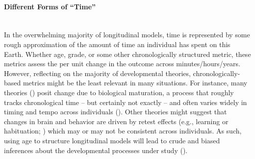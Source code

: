 \documentclass[11pt]{article}
\newcommand{\subsubsubsection}[1]{\paragraph{#1}\mbox{}\\}  %
\begin{document}
\subsubsubsection{Different Forms of “Time”}
In the overwhelming majority of longitudinal models, time is represented by some rough approximation of the amount of time an individual has spent on this Earth. Whether age, grade, or some other chronologically structured metric, these metrics assess the per unit change in the outcome across minutes/hours/years. However, reflecting on the majority of developmental theories, chronologically-based metrics might be the least relevant in many situations. For instance, many theories (\cite{casey_beyond_2015,van_duijvenvoorde_what_2016,wierenga_unraveling_2018}) posit change due to biological maturation, a process that roughly tracks chronological time -- but certainly not exactly -- and often varies widely in timing and tempo across individuals (\cite{marceau_individual_2011}). Other theories might suggest that changes in brain and behavior are driven by retest effects (e.g., learning or habituation; \cite{ferrer_modeling_2004,mccormick_multi-level_2021,mccormick_longitudinal_2021}) which may or may not be consistent across individuals. As such, using age to structure longitudinal models will lead to crude and biased inferences about the developmental processes under study (\cite{mccormick_multi-level_2021}).
\end{document}
